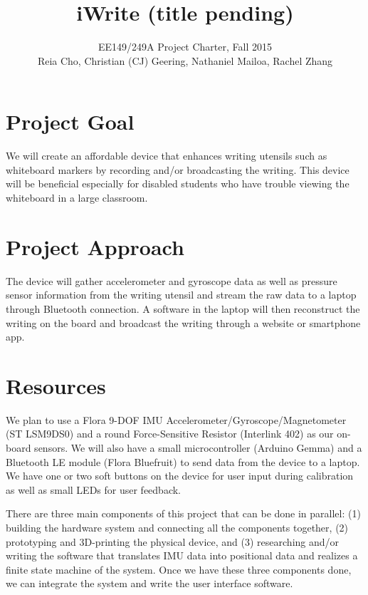 \documentclass[12pt,journal]{IEEEtran}
\begin{document}
\title{iWrite (title pending)}

\author{EE149/249A Project Charter, Fall 2015

Reia Cho, Christian (CJ) Geering, Nathaniel Mailoa, Rachel Zhang}


\maketitle

\section{Project Goal}
We will create an affordable device that enhances writing utensils such as whiteboard markers by recording and/or broadcasting the writing. This device will be beneficial especially for disabled students who have trouble viewing the whiteboard in a large classroom.


\section{Project Approach}
The device will gather accelerometer and gyroscope data as well as pressure sensor information from the writing utensil and stream the raw data to a laptop through Bluetooth connection. A software in the laptop will then reconstruct the writing on the board and broadcast the writing through a website or smartphone app.


\section{Resources}
We plan to use a Flora 9-DOF IMU Accelerometer/Gyroscope/Magnetometer (ST LSM9DS0) and a round Force-Sensitive Resistor (Interlink 402) as our on-board sensors. We will also have a small microcontroller (Arduino Gemma) and a Bluetooth LE module (Flora Bluefruit) to send data from the device to a laptop. We have one or two soft buttons on the device for user input during calibration as well as small LEDs for user feedback. 

There are three main components of this project that can be done in parallel: (1) building the hardware system and connecting all the components together, (2) prototyping and 3D-printing the physical device, and (3) researching and/or writing the software that translates IMU data into positional data and realizes a finite state machine of the system. Once we have these three components done, we can integrate the system and write the user interface software.
\end{document}
